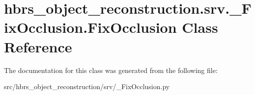 \hypertarget{classhbrs__object__reconstruction_1_1srv_1_1___fix_occlusion_1_1_fix_occlusion}{\section{hbrs\-\_\-object\-\_\-reconstruction.\-srv.\-\_\-\-Fix\-Occlusion.\-Fix\-Occlusion \-Class \-Reference}
\label{classhbrs__object__reconstruction_1_1srv_1_1___fix_occlusion_1_1_fix_occlusion}
}


\-The documentation for this class was generated from the following file\-:\begin{DoxyCompactItemize}
\item 
src/hbrs\-\_\-object\-\_\-reconstruction/srv/\-\_\-\-Fix\-Occlusion.\-py\end{DoxyCompactItemize}
